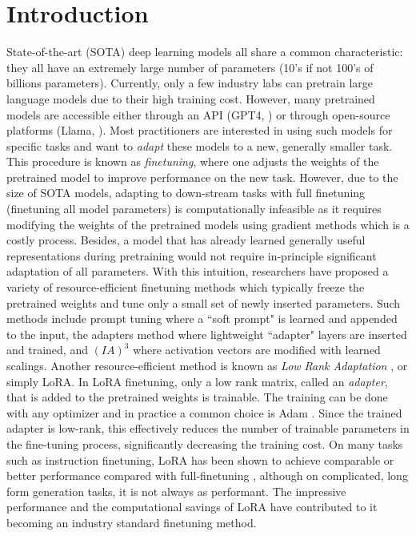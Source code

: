 \section{Introduction}

State-of-the-art (SOTA) deep learning models all share a common characteristic: they all have an extremely large number of parameters (10's if not 100's of billions parameters). Currently, only a few industry labs can pretrain large language models due to their high training cost. However, many pretrained models are accessible either through an API (GPT4, \cite{openai2023gpt4}) or through open-source platforms (Llama, \cite{touvron2023llama}). Most practitioners are interested in using such models for specific tasks and want to \emph{adapt} these models to a new, generally smaller task. This procedure is known as \emph{finetuning}, where one adjusts the weights of the pretrained model to improve performance on the new task. However, due to the size of SOTA models, adapting to down-stream tasks with full finetuning (finetuning all model parameters) is computationally infeasible as it requires modifying the weights of the pretrained models using gradient methods which is a costly process.  Besides, a model that has already learned generally useful representations during pretraining would not require  in-principle significant adaptation of all parameters. With this intuition, researchers have proposed a variety of resource-efficient finetuning methods which typically freeze the pretrained weights and tune only a small set of newly inserted parameters. Such methods include prompt tuning \citep{lester2021power} where a ``soft prompt" is learned and appended to the input, the adapters method \citep{houlsby2019parameter} where  lightweight ``adapter" layers are inserted and trained, and $(IA)^3$ \citep{liu2022few} where activation vectors are modified with learned scalings. Another resource-efficient method is known as \emph{Low Rank Adaptation} \citep{hu2021lora}, or simply LoRA. In LoRA finetuning, only a low rank matrix, called an \textit{adapter}, that is added to the pretrained weights is trainable. The training can be done with any optimizer and in practice a common choice is Adam \citep{kingma2014adam}. Since the trained adapter is low-rank, this effectively reduces the number of trainable parameters in the fine-tuning process, significantly decreasing the training cost. On many tasks such as instruction finetuning, LoRA has been shown to achieve comparable or better performance compared with full-finetuning \citep{wang2023far, liu2023improved}, although on complicated, long form generation tasks, it is not always as performant. The impressive performance and the computational savings of LoRA have contributed to it becoming an industry standard finetuning method. 

